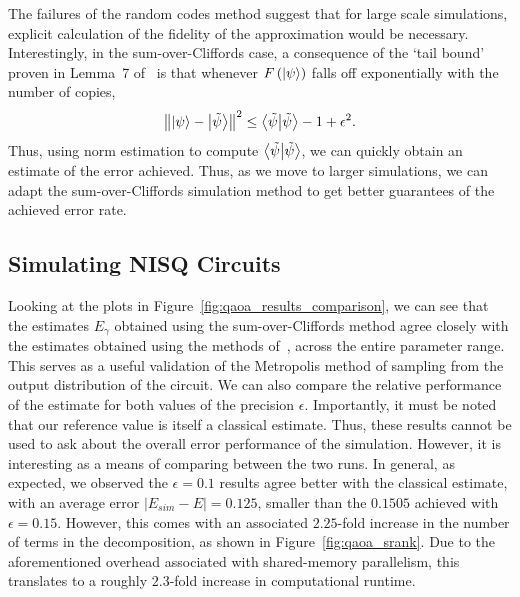 The failures of the random codes method  suggest that for large scale simulations, explicit calculation of the fidelity of the approximation would be necessary. Interestingly, in the sum-over-Cliffords case, a consequence of the `tail bound' proven in Lemma~7 of~\cite{Bravyi2018} is that whenever $F\left(\ket{\psi}\right)$ falls off exponentially with the number of copies,
\begin{equation}
\norm{\ket{\psi}-\ket{\tilde{\psi}}}^{2} \leq \braket{\tilde{\psi}} -1 + \epsilon^{2}.
\end{equation}
Thus, using norm estimation to compute $\braket{\tilde{\psi}}$, we can quickly obtain an estimate of the error achieved. Thus, as we move to larger simulations, we can adapt the sum-over-Cliffords simulation method to get better guarantees of the achieved error rate.
\subsection{Simulating NISQ Circuits}
Looking at the plots in Figure~\ref{fig:qaoa_results_comparison}, we can see that the estimates $E_{\gamma}$ obtained using the sum-over-Cliffords method agree closely with the estimates obtained using the methods of~\cite{VandenNest2009}, across the entire parameter range. This serves as a useful validation of the Metropolis method of sampling from the output distribution of the circuit. We can also compare the relative performance of the estimate for both values of the precision $\epsilon$. Importantly, it must be noted that our reference value is itself a classical estimate. Thus, these results cannot be used to ask about the overall error performance of the simulation. However, it is interesting as a means of comparing between the two runs. In general, as expected, we observed the $\epsilon=0.1$ results agree better with the classical estimate, with an average error $\left|E_{sim}-E\right|=0.125$, smaller than the $0.1505$ achieved with $\epsilon=0.15$. However, this comes with an associated $2.25$-fold increase in the number of terms in the decomposition, as shown in Figure~\ref{fig:qaoa_srank}. Due to the aforementioned overhead associated with shared-memory parallelism, this translates to a roughly $2.3$-fold increase in computational runtime.\par
